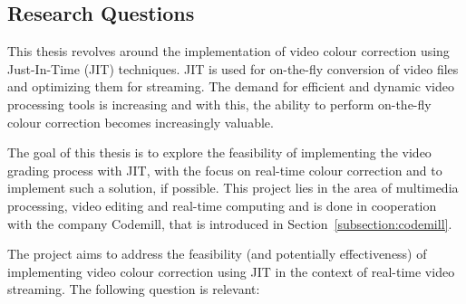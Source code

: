 \documentclass[../MasterThesis.tex]{subfiles}
\begin{document}
	
	
	
	
	
	
	
	
	
	
	
	
	
	
	
	\subsection{Research Questions} \label{subsection:research%
		TODOquestions}
	
	
	This thesis revolves around the implementation of video colour correction using Just-In-Time (JIT) techniques. 	
	JIT is used for on-the-fly conversion of video files and optimizing them for streaming. 
	The demand for efficient and dynamic video processing tools is increasing and with this, the ability to perform on-the-fly colour correction becomes increasingly valuable. 
	
	The goal of this thesis is to explore the feasibility of implementing the video grading process with JIT, with the focus on real-time colour correction and to implement such a solution, if possible. This project lies in the area of multimedia processing, video editing and real-time computing and is done in cooperation with the company Codemill, that is introduced in Section~\ref{subsection:codemill}.
	
	
	
	The project aims to address the feasibility (and potentially effectiveness) of implementing video colour correction using JIT in the context of real-time video streaming. The following question is relevant:
	
\end{document}
